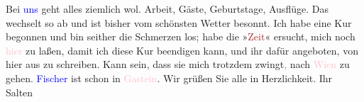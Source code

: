 \pstart
           Bei \textcolor{blue}{uns}{}\ledrightnote{{$\rightarrow$}\textcolor{blue}{Ottilie Salten}} geht alles ziemlich
               wol. Arbeit, Gäste, Geburtstage, Ausflüge. Das wechselt so ab und ist bisher vom
               schönsten Wetter besonnt. Ich habe eine Kur begonnen und bin seither die Schmerzen
               los; habe die »\textcolor{brown}{Zeit}{}\ledrightnote{\textcolor{brown}{Die Zeit}}« ersucht, mich noch \textcolor{pink}{hier}{}\ledrightnote{{$\rightarrow$}\textcolor{pink}{Berghof}} zu laßen, damit ich diese
               Kur beendigen kann, und ihr dafür angeboten, von hier aus zu schreiben. Kann sein,
               dass sie mich trotzdem zwingt\textcolor{gray}{,} nach \textcolor{pink}{Wien}{}\ledrightnote{\textcolor{pink}{Wien}} zu gehen. \textcolor{blue}{Fischer}{}\ledrightnote{\textcolor{blue}{Samuel Fischer}} ist schon in
                  \textcolor{pink}{Gastein}{}\ledrightnote{\textcolor{pink}{Bad Gastein}}. Wir grüßen Sie alle in
               Herzlichkeit.\pend
           \pstart Ihr \spacefill\mbox{Salten}\pend{}\endnumbering{}  
      